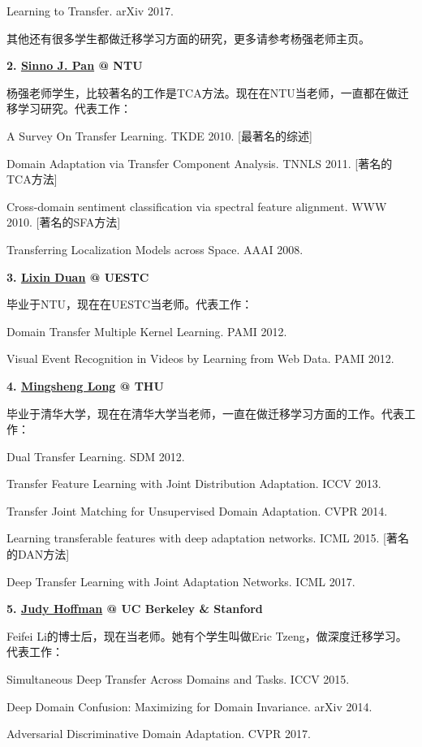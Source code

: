 Learning to Transfer. arXiv 2017.

其他还有很多学生都做迁移学习方面的研究，更多请参考杨强老师主页。

\textbf{2. \href{http://www.cs.ust.hk/~qyang/}{Sinno J. Pan} @ NTU}

杨强老师学生，比较著名的工作是TCA方法。现在在NTU当老师，一直都在做迁移学习研究。代表工作：

A Survey On Transfer Learning. TKDE 2010. [最著名的综述]

Domain Adaptation via Transfer Component Analysis. TNNLS 2011. [著名的TCA方法]

Cross-domain sentiment classification via spectral feature alignment. WWW 2010. [著名的SFA方法]

Transferring Localization Models across Space. AAAI 2008.


\textbf{3. \href{http://www.lxduan.info/}{Lixin Duan} @ UESTC}

毕业于NTU，现在在UESTC当老师。代表工作：

Domain Transfer Multiple Kernel Learning. PAMI 2012.

Visual Event Recognition in Videos by Learning from Web Data. PAMI 2012.


\textbf{4. \href{http://ise.thss.tsinghua.edu.cn/~mlong/}{Mingsheng Long} @ THU}

毕业于清华大学，现在在清华大学当老师，一直在做迁移学习方面的工作。代表工作：

Dual Transfer Learning. SDM 2012.

Transfer Feature Learning with Joint Distribution Adaptation. ICCV 2013.

Transfer Joint Matching for Unsupervised Domain Adaptation. CVPR 2014.

Learning transferable features with deep adaptation networks. ICML 2015. [著名的DAN方法]

Deep Transfer Learning with Joint Adaptation Networks. ICML 2017.


\textbf{5. \href{http://people.eecs.berkeley.edu/~jhoffman/}{Judy Hoffman} @ UC Berkeley \& Stanford}

Feifei Li的博士后，现在当老师。她有个学生叫做Eric Tzeng，做深度迁移学习。代表工作：

Simultaneous Deep Transfer Across Domains and Tasks. ICCV 2015.

Deep Domain Confusion: Maximizing for Domain Invariance. arXiv 2014.

Adversarial Discriminative Domain Adaptation. CVPR 2017.


